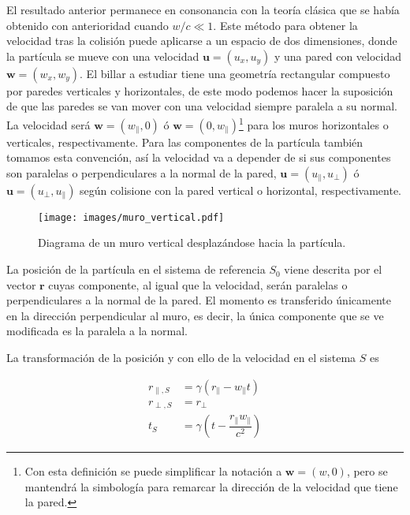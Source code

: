 \documentclass[11pt, spanish]{book}
\begin{document}
El resultado anterior permanece en consonancia con la teoría clásica que se había obtenido con anterioridad cuando \( w/c \ll 1 \). Este método para obtener la velocidad tras la colisión puede aplicarse a un espacio de dos dimensiones, donde la partícula se mueve con una velocidad \( \mathbf{u} = (u_x, u_y) \) y una pared con velocidad \( \mathbf{w} = (w_x, w_y) \). El billar a estudiar tiene una geometría rectangular compuesto por paredes verticales y horizontales, de este modo podemos hacer la suposición de que las paredes se van mover con una velocidad siempre paralela a su normal. La velocidad será \( \mathbf{w} = (w_\parallel, 0) \) ó \( \mathbf{w} = (0, w_\parallel) \)\footnote{Con esta definición se puede simplificar la notación a \( \mathbf{w} = (w, 0) \), pero se mantendrá la simbología para remarcar la dirección de la velocidad que tiene la pared.} para los muros horizontales o verticales, respectivamente. Para las componentes de la partícula también tomamos esta convención, así la velocidad va a depender de si sus componentes son paralelas o perpendiculares a la normal de la pared, \( \mathbf{u} = (u_\parallel, u_\perp) \) ó \( \mathbf{u} = (u_\perp, u_\parallel) \) según colisione con la pared vertical o horizontal, respectivamente.

\begin{figure}[H]
    \centering
    \texttt{[image: images/muro\_vertical.pdf]}
    \caption{Diagrama de un muro vertical desplazándose hacia la partícula.}
    \label{fig:muro_vertical}
\end{figure}

La posición de la partícula en el sistema de referencia \( S_0 \) viene descrita por el vector \( \mathbf{r} \) cuyas componente, al igual que la velocidad, serán paralelas o perpendiculares a la normal de la pared. El momento es transferido únicamente en la dirección perpendicular al muro, es decir, la única componente que se ve modificada es la paralela a la normal. 


\vspace{3mm}

La transformación de la posición y con ello de la velocidad en el sistema \( S \) es

\begin{align}\label{eq:transformacion_2d}
    r_{\parallel,S} &= \gamma\left( r_\parallel - w_\parallel t \right) \nonumber\\
    r_{\perp, S} &= r_\perp  \\
    t_S &= \gamma\left( t - \dfrac{r_\parallel w_\parallel}{c^2} \right) \nonumber
\end{align}
\end{document}
